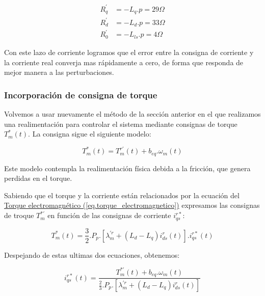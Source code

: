 \documentclass{article}
\begin{document}
\begin{align*}
    R_q^\prime &= -L_q.p = 29\varOmega  \\
    R_d^\prime &= -L_d.p = 33\varOmega \\
    R_0^\prime &= -L_{ls}.p = 4\varOmega
\end{align*}

Con este lazo de corriente logramos que el error entre la consigna de corriente y la corriente real
converja mas rápidamente a cero, de forma que responda de mejor manera a las perturbaciones.




\subsubsection{Incorporación de consigna de torque}

Volvemos a usar nuevamente el método de la sección anterior en el que realizamos una realimentación
para controlar el sistema mediante consignas de torque $T_m^*(t)$. La consigna sigue el siguiente modelo:

\begin{equation}
    T_m^*(t) = T_m^{r\prime}(t) + b_{eq}.\omega_m(t)
\end{equation}

Este modelo contempla la realimentación física debida a la fricción, que genera perdidas en el torque.

Sabiendo que el torque y la corriente están relacionados por la ecuación del
\hyperref[eq.torque_electromagnetico]{Torque electromagnético (\ref*{eq.torque_electromagnetico})}
expresamos las consignas de troque $T_m^{*\prime}$ en función de las consignas de corriente $i_{qs}^{r*}$:

\begin{equation}
    T_m^{*}(t) = \frac{3}{2}.P_p.[\lambda_m^{\prime r} + (L_d - L_q)i_{ds}^{r}(t)].i_{qs}^{r*}(t)
\end{equation}

Despejando de estas ultimas dos ecuaciones, obtenemos:

\begin{equation}
    i_{qs}^{r*}(t) = \frac{T_m^{*\prime}(t) + b_{eq}.\omega_m(t)}{\frac{2}{3}.P_p.[\lambda_m^{\prime r} + (L_d - L_q)i_{ds}^{r}(t)]}
\end{equation}
\end{document}

